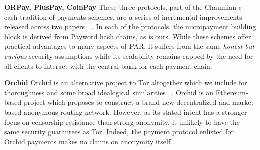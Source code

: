 \textbf{ORPay, PlusPay, CoinPay} These three protocols, part of the Chaumian
e-cash tradition of payments schemes, are a series of incremental improvements
released across two papers~\cite{chen2009xpay}~\cite{carbunar2012tipping}. In
each of the protocols, the micropayment building block is derived from Payword
hash chains, as is ours. While these schemes offer practical advantages to many
aspects of PAR, it suffers from the same \emph{honest but curious} security
assumptions while its scalability remains capped by the need for all clients to
interact with the central bank for each payment chain.

\textbf{Orchid} Orchid is an alternative project to Tor altogether which we
include for thoroughness and some broad idealogical similarities
~\cite{salamon2018orchid}. Orchid is an Ethereum-based project which proposes to
construct a brand new decentralized and market-based anonymous routing
network. However, as its stated intent has a stronger focus on censorship
resistance than strong anonymity, it unlikely to have the same security
guarantees as Tor. Indeed, the payment protocol enlisted for Orchid payments
makes no claims on anonymity itself~\cite{pass2015micropayments}.